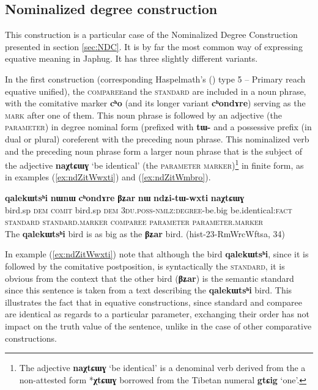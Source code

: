 \documentclass[oneside,a4paper,11pt]{article}
\newcommand{\ipa}[1]{{\phon\textbf{#1}}} %
\newcommand{\forme}[2]{\ipa{#1} `#2'}
\begin{document}
\subsection{Nominalized degree construction} \label{sec:NDC.equative}
This construction is a particular case of the Nominalized Degree Construction presented in section \ref{sec:NDC}. It is by far the most common way of expressing equative meaning in Japhug. It has three slightly different variants. 

In the first construction (corresponding Haspelmath's (\citeyear{haspelmath17equative}) type 5 -- Primary reach equative unified), the \textsc{comparee}and the \textsc{standard} are included in a noun phrase, with the comitative marker \ipa{cʰo} (and its longer variant \ipa{cʰondɤre}) serving as the \textsc{mark} after one of them. This noun phrase is followed by an adjective (the \textsc{parameter}) in degree nominal form (prefixed with \ipa{tɯ-} and a possessive prefix (in dual or plural) coreferent with the preceding noun phrase. This nominalized verb and the preceding noun phrase form a larger noun phrase that is the subject of the adjective \forme{naχtɕɯɣ}{be identical} (the \textsc{parameter marker})\footnote{The adjective \forme{naχtɕɯɣ}{be identical} is a denominal verb derived from the a non-attested form *\ipa{χtɕɯɣ} borrowed from the Tibetan numeral \forme{gtɕig}{one}. } in finite form, as in examples (\ref{ex:ndZitWwxti}) and (\ref{ex:ndZitWmbro}).

\begin{exe}
\ex \label{ex:ndZitWwxti}
\glll
\ipa{qalekɯtsʰi} 	\ipa{nɯnɯ} 	\ipa{cʰondɤre} 	\ipa{βʑar} 	\ipa{nɯ} 	\ipa{ndʑi-tɯ-wxti} 	\ipa{naχtɕɯɣ} \\
bird.sp \textsc{dem} \textsc{comit} bird.sp \textsc{dem} \textsc{3du.poss-nmlz:degree}-be.big be.identical:\textsc{fact} \\
{\textsc{standard}} { } \textsc{standard.marker} {\textsc{comparee}} { } \textsc{parameter} \textsc{parameter.marker} \\
\glt The \ipa{qalekɯtsʰi} bird is as big as the \ipa{βʑar} bird. (hist-23-RmWrcWftsa, 34)
\end{exe}

In example (\ref{ex:ndZitWwxti}) note that although the bird \ipa{qalekɯtsʰi}, since it is followed by the comitative postposition, is syntactically the \textsc{standard}, it is obvious from the context that the other bird (\ipa{βʑar}) is the semantic standard since this sentence is taken from a text describing the \ipa{qalekɯtsʰi} bird. This illustrates the fact that in equative constructions, since standard and comparee are identical as regards to a particular parameter, exchanging their order has not impact on the truth value of the sentence, unlike in the case of other comparative constructions.
\end{document}
